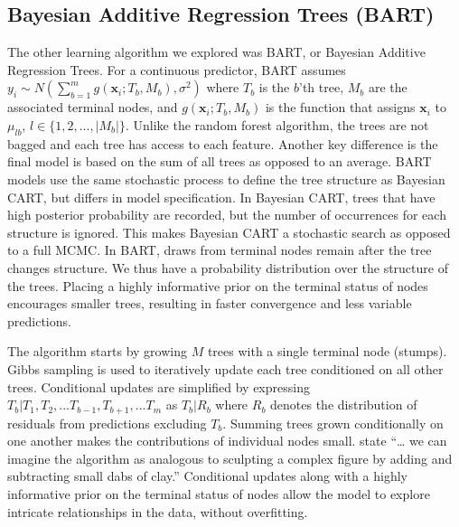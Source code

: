 \documentclass[
  12pt,
  letterpaper,
  DIV=11,
  numbers=noendperiod]{scrartcl}
\newcommand{\bm}{\mathbf}
\begin{document}
\subsection{Bayesian Additive Regression Trees
(BART)}\label{bayesian-additive-regression-trees-bart}

The other learning algorithm we explored was BART, or Bayesian Additive
Regression Trees. For a continuous predictor, BART assumes
\(y_i\sim N(\sum_{b=1}^m g(\bm x_i;T_b,M_b), \sigma^2)\) where \(T_b\)
is the \(b\)'th tree, \(M_b\) are the associated terminal nodes, and
\(g(\bm x_i;T_b,M_b)\) is the function that assigns \(\bm x_i\) to
\(\mu_{lb}\), \(l\in\{1,2,...,|M_b|\}\). Unlike the random forest
algorithm, the trees are not bagged and each tree has access to each
feature. Another key difference is the final model is based on the sum
of all trees as opposed to an average. BART models use the same
stochastic process to define the tree structure as Bayesian CART, but
differs in model specification. In Bayesian CART, trees that have high
posterior probability are recorded, but the number of occurrences for
each structure is ignored. This makes Bayesian CART a stochastic search
as opposed to a full MCMC. In BART, draws from terminal nodes remain
after the tree changes structure. We thus have a probability
distribution over the structure of the trees. Placing a highly
informative prior on the terminal status of nodes encourages smaller
trees, resulting in faster convergence and less variable predictions.

The algorithm starts by growing \(M\) trees with a single terminal node
(stumps). Gibbs sampling is used to iteratively update each tree
conditioned on all other trees. Conditional updates are simplified by
expressing \(T_b|T_1,T_2,...T_{b-1},T_{b+1},...T_m\) as \(T_b|R_b\)
where \(R_b\) denotes the distribution of residuals from predictions
excluding \(T_b\). Summing trees grown conditionally on one another
makes the contributions of individual nodes small. \cite{bart_paper}
state ``\ldots{} we can imagine the algorithm as analogous to sculpting
a complex figure by adding and subtracting small dabs of clay.''
Conditional updates along with a highly informative prior on the
terminal status of nodes allow the model to explore intricate
relationships in the data, without overfitting.
\end{document}
